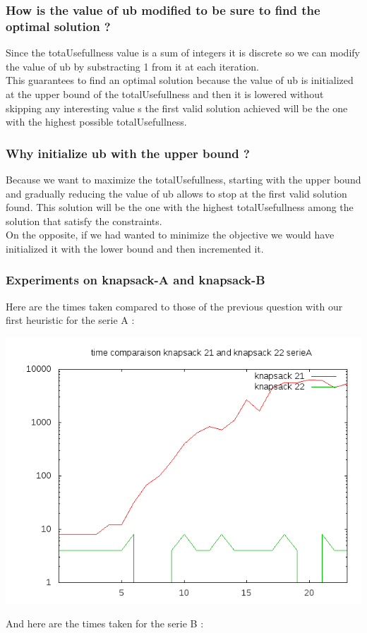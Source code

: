 \documentclass{eplDoc}
\begin{document}
\subsubsection{How is the value of ub modified to be sure to find the optimal solution ?}
Since the totaUsefullness value is a sum of integers it is discrete so we can modify the value of ub by substracting 1 from it at each iteration. \\ 
This guarantees to find an optimal solution because the value of ub is initialized at the upper bound of the totalUsefullness and then it is lowered without skipping any interesting value s the first valid solution achieved will be the one with the highest possible totalUsefullness. 

\subsubsection{Why initialize ub with the upper bound ?}
Because we want to maximize the totalUsefullness, starting with the upper bound and gradually reducing the value of ub allows to stop at the first valid solution found. This solution will be the one with the highest totalUsefullness among the solution that satisfy the constraints. \\ 
On the opposite, if we had wanted to minimize the objective we would have initialized it with the lower bound and then incremented it.

\subsubsection{Experiments on knapsack-A and knapsack-B}
Here are the times taken compared to those of the previous question with our first heuristic for the serie A : 
\begin{center}
\includegraphics[width=\columnwidth]{q32timeA.png}%
\end{center}
And here are the times taken for the serie B : 
\end{document}
